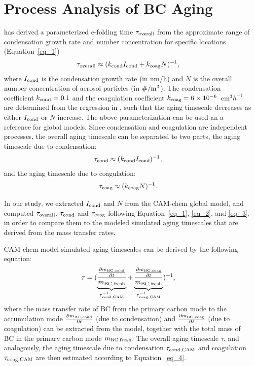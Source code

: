 \documentclass[12pt, fullpage]{uiucthesis2009}
\begin{document}
	\section{Process Analysis of BC Aging}
	\cite{Fierce2016} has derived a parameterized e-folding time $\tau_{\rm overall}$ from the approximate range of condensation growth rate and number concentration for specific locations (Equation~\ref{eq_1}) 
	\begin{align}{\label{eq_1}}
	\tau_{\rm overall} \approx (k_{\rm cond}I_{\rm cond} + k_{\rm coag}N)^{-1},
	\end{align} 
	where $I_{\rm cond}$ is the condensation growth rate (in nm/h) and $N$ is the overall number concentration of aerosol particles (in $\rm \# /m^3$). The condensation coefficient $k_{\rm cond} = 0.1$ and the coagulation coefficient $k_{\rm coag} = 6\times 10^{-6}$~$\text{cm}^3h^{-1}$ are determined from the regression in \cite{Fierce2016}, such that the aging timescale decreases as either $I_{\rm cond}$ or $N$ increase. The above parameterization can be used an a reference for global models. Since condensation and coagulation are independent processes, the overall aging timescale can be separated to two parts, the aging timescale due to condensation:
	\begin{align}{\label{eq_2}}
	\tau_{\rm cond} \approx (k_{\rm cond}I_{\rm cond})^{-1},
	\end{align} 
	and the aging timescale due to coagulation:
	\begin{align}{\label{eq_3}}
	\tau_{\rm coag} \approx (k_{\rm coag}N)^{-1}.
	\end{align}  
	
    In our study, we extracted $I_{\rm cond}$ and $N$ from the CAM-chem global model, and computed $\tau_{\rm overall}$, $\tau_{\rm cond}$ and $\tau_{\rm coag}$ following Equation~\ref{eq_1}, \ref{eq_2}, and \ref{eq_3}, in order to compare them to the modeled simulated aging timescales that are derived from the mass transfer rates.
	
	CAM-chem model simulated aging timescales can be derived by the following equation:
	\begin{align}{\label{eq_4}}
	\tau = (\underbrace{\frac{\frac{\partial m_{\rm BC, cond}}{\partial t}}{m_{\rm BC, fresh}}}_{\tau_{\rm cond, CAM}^{-1}} + \underbrace{\frac{\frac{\partial m_{\rm BC, coag}}{\partial t}}{m_{\rm BC, fresh}}}_{\tau_{\rm coag, CAM}^{-1}})^{-1},
	\end{align} 
	where the mass transfer rate of BC from the primary carbon mode to the accumulation mode $\frac{\partial m_{\rm BC, cond}}{\partial t}$ (due to condensation) and $\frac{\partial m_{\rm BC, coag}}{\partial t}$ (due to coagulation) can be extracted from the model, together with the total mass of BC in the primary carbon mode $m_{\rm BC, fresh}$. The overall aging timescale $\tau$, and analogously, the aging timescale due to condensation $\tau_{\rm cond, CAM}$ and coagulation $\tau_{\rm coag, CAM}$ are then estimated according to Equation~\ref{eq_4}.
	
\end{document}
